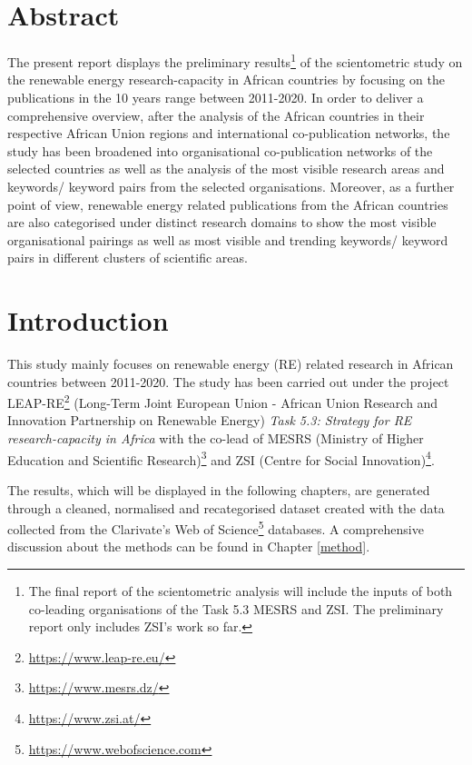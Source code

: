 \documentclass[12pt,twoside]{report}
\title{\bftext{LEAP-RE T5.3}}
\subtitle{Scientometric Analysis of Renewable Energy Research-Capacity in Africa \vfill}
\author{Author: Utku B. Demir}
\date{ZSI-Team: Dietmar Lampert, Elke Dall, Utku B. Demir \vfill \texttt{[image: ./leapre]}}
\let\rmarkdownfootnote\footnote%
\def\footnote{\protect\rmarkdownfootnote}
\renewcommand{\href}[2]{#2\footnote{\url{#1}}}
\begin{document}
\maketitle

{
\setcounter{tocdepth}{1}
\tableofcontents
}
\hypertarget{abstract}{%
\chapter*{Abstract}\label{abstract}}

The present report displays the preliminary results\footnote{The final report of the scientometric analysis will include the inputs of both co-leading organisations of the Task 5.3 MESRS and ZSI. The preliminary report only includes ZSI's work so far.} of the scientometric study on the renewable energy
research-capacity in African countries by focusing on the publications in the 10 years range between 2011-2020. In order to deliver a comprehensive overview, after the analysis of the African countries in their respective African Union regions and international co-publication networks, the study has been broadened into organisational co-publication networks of the selected countries as well as the analysis of the most visible research areas and keywords/ keyword pairs from the selected organisations. Moreover, as a further point of view, renewable energy related publications from the African countries are also categorised under distinct research domains to show the most visible organisational pairings as well as most visible and trending keywords/ keyword pairs in different clusters of scientific areas.


\hypertarget{intro}{%
\chapter{Introduction}\label{intro}}

This study mainly focuses on renewable energy (RE) related research in African countries between 2011-2020. The study has been carried out under the project \href{https://www.leap-re.eu/}{LEAP-RE} (Long-Term Joint European Union - African Union Research and Innovation Partnership on Renewable Energy) \emph{Task 5.3: Strategy for RE research-capacity in Africa} with the co-lead of \href{https://www.mesrs.dz/}{MESRS (Ministry of Higher Education and Scientific Research)} and \href{https://www.zsi.at/}{ZSI (Centre for Social Innovation)}.

The results, which will be displayed in the following chapters, are generated through a cleaned, normalised and recategorised dataset created with the data collected from the \href{https://www.webofscience.com}{Clarivate's Web of Science} databases. A comprehensive discussion about the methods can be found in Chapter \ref{method}.
\end{document}
